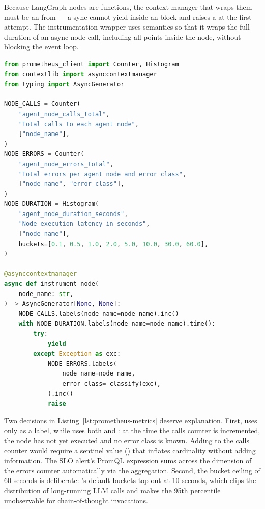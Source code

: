 Because LangGraph nodes are  functions, the context manager
that wraps them must be an  from
 --- a sync  cannot yield inside an
 block and raises a  at the first
attempt. The instrumentation wrapper uses  semantics so
that it wraps the full duration of an async node call, including all
 points inside the node, without blocking the event loop.

\begin{lstlisting}[language=Python,
  caption={Prometheus counters and async instrumentation context manager ---
    \texttt{src/observability/metrics.py}},
  label={lst:prometheus-metrics}]
from prometheus_client import Counter, Histogram
from contextlib import asynccontextmanager
from typing import AsyncGenerator

NODE_CALLS = Counter(
    "agent_node_calls_total",
    "Total calls to each agent node",
    ["node_name"],
)
NODE_ERRORS = Counter(
    "agent_node_errors_total",
    "Total errors per agent node and error class",
    ["node_name", "error_class"],
)
NODE_DURATION = Histogram(
    "agent_node_duration_seconds",
    "Node execution latency in seconds",
    ["node_name"],
    buckets=[0.1, 0.5, 1.0, 2.0, 5.0, 10.0, 30.0, 60.0],
)

@asynccontextmanager
async def instrument_node(
    node_name: str,
) -> AsyncGenerator[None, None]:
    NODE_CALLS.labels(node_name=node_name).inc()
    with NODE_DURATION.labels(node_name=node_name).time():
        try:
            yield
        except Exception as exc:
            NODE_ERRORS.labels(
                node_name=node_name,
                error_class=_classify(exc),
            ).inc()
            raise
\end{lstlisting}

Two decisions in Listing~\ref{lst:prometheus-metrics} deserve explanation.
First,  uses only  as a label, while
 uses both  and :
at the time the calls counter is incremented, the node has not yet executed
and no error class is known. Adding  to the calls counter
would require a sentinel value () that inflates cardinality
without adding information. The SLO alert's PromQL expression sums across
the  dimension of the errors counter automatically via
the  aggregation. Second, the  bucket ceiling
of 60 seconds is deliberate: 's default buckets top
out at 10 seconds, which clips the distribution of long-running LLM calls
and makes the 95th percentile unobservable for chain-of-thought invocations.

